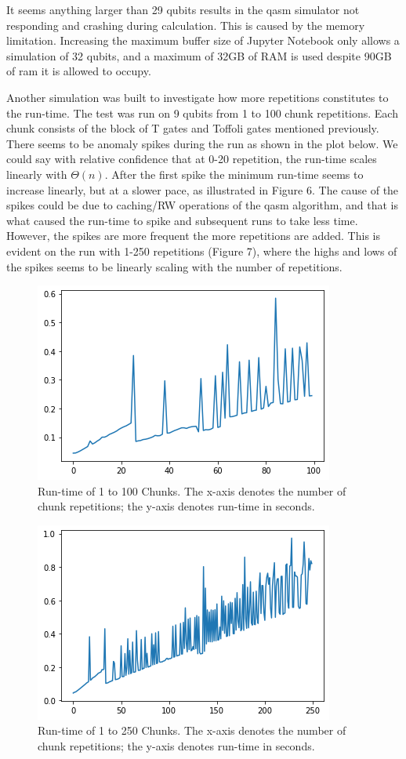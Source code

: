 \documentclass{article}
\begin{document}
It seems anything larger than 29 qubits results in the qasm simulator not responding and crashing during calculation. This is caused by the memory limitation. Increasing the maximum buffer size of Jupyter Notebook only allows a simulation of 32 qubits, and a maximum of 32GB of RAM is used despite 90GB of ram it is allowed to occupy.

Another simulation was built to investigate how more repetitions constitutes to the run-time. The test was run on 9 qubits from 1 to 100 chunk repetitions. Each chunk consists of the block of T gates and Toffoli gates mentioned previously. There seems to be anomaly spikes during the run as shown in the plot below. We could say with relative confidence that at 0-20 repetition, the run-time scales linearly with $\Theta(n)$. After the first spike the minimum run-time seems to increase linearly, but at a slower pace, as illustrated in Figure 6. The cause of the spikes could be due to caching/RW operations of the qasm algorithm, and that is what caused the run-time to spike and subsequent runs to take less time. However, the spikes are more frequent the more repetitions are added. This is evident on the run with 1-250 repetitions (Figure 7), where the highs and lows of the spikes seems to be linearly scaling with the number of repetitions.

\begin{figure}[p]
    \centering
    \includegraphics[width = 0.7\linewidth]{runtime/9 1-100.png}
    \caption{Run-time of 1 to 100 Chunks. The x-axis denotes the number of chunk repetitions; the y-axis denotes run-time in seconds.}
    \label{fig:my_label}
\end{figure}

\begin{figure}[p]
    \centering
    \includegraphics[width = 0.7\linewidth]{runtime/9 1-250.png}
    \caption{Run-time of 1 to 250 Chunks. The x-axis denotes the number of chunk repetitions; the y-axis denotes run-time in seconds.}
    \label{fig:my_label}
\end{figure}
\newpage
\end{document}
